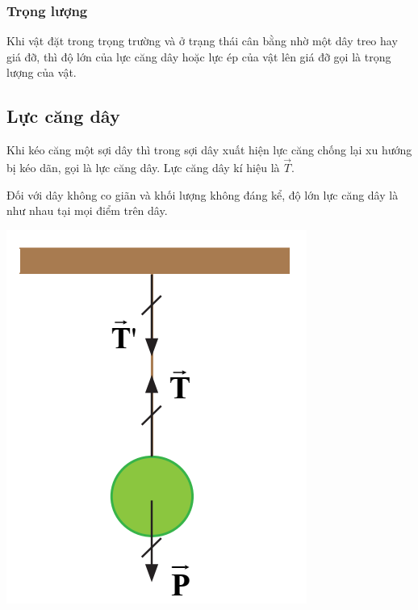 \subsubsection{Trọng lượng}
Khi vật đặt trong trọng trường và ở trạng thái cân bằng nhờ một dây treo hay giá đỡ, thì độ lớn của lực căng dây hoặc lực ép của vật lên giá đỡ gọi là trọng lượng của vật.  

\subsection{Lực căng dây}
\begin{minipage}[l]{0.5\textwidth}
	Khi kéo căng một sợi dây thì trong sợi dây xuất hiện lực căng chống lại xu hướng bị kéo dãn, gọi là lực căng dây. Lực căng dây kí hiệu là $\vec{T}$.

	Đối với dây không co giãn và khối lượng không đáng kể, độ lớn lực căng dây là như nhau tại mọi điểm trên dây. 
	
\end{minipage}
\begin{minipage}[r]{0.5\textwidth}
	\begin{center}
		\includegraphics[width=0.3\linewidth]{../figs/VN10-2023-PH-TP018-1}
	\end{center}
\end{minipage}
